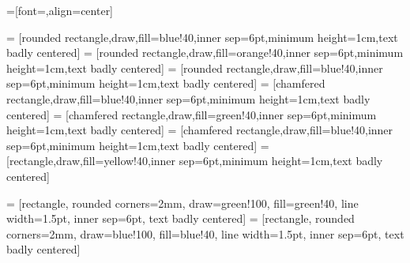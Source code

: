


=[font=\sffamily,align=center]

\newcommand{\lineOpacity}{100}
\newcommand{\fillOpacity}{40}

\newcommand{\explicitColor}{green}
\newcommand{\implicitColor}{blue}
\newcommand{\optimizationColor}{blue} %
\newcommand{\dataColor}{purple}

\newcommand{\compShape}{rectangle}
\newcommand{\groupShape}{chamfered rectangle}
\newcommand{\procShape}{rounded rectangle}

 = [\procShape,draw,fill=\optimizationColor!\fillOpacity,inner sep=6pt,minimum height=1cm,text badly centered]
 = [\procShape,draw,fill=orange!\fillOpacity,inner sep=6pt,minimum height=1cm,text badly centered]
 = [\procShape,draw,fill=\optimizationColor!\fillOpacity,inner sep=6pt,minimum height=1cm,text badly centered]
 = [\groupShape,draw,fill=\optimizationColor!\fillOpacity,inner sep=6pt,minimum height=1cm,text badly centered]
 = [\groupShape,draw,fill=\explicitColor!\fillOpacity,inner sep=6pt,minimum height=1cm,text badly centered]
 = [\groupShape,draw,fill=\implicitColor!\fillOpacity,inner sep=6pt,minimum height=1cm,text badly centered]
 = [\compShape,draw,fill=yellow!\fillOpacity,inner sep=6pt,minimum height=1cm,text badly centered]

 = [\compShape, rounded corners=2mm, draw=\explicitColor!\lineOpacity, fill=\explicitColor!\fillOpacity, line width=1.5pt, inner sep=6pt, text badly centered]
 = [\compShape, rounded corners=2mm, draw=\implicitColor!\lineOpacity, fill=\implicitColor!\fillOpacity, line width=1.5pt, inner sep=6pt, text badly centered]

